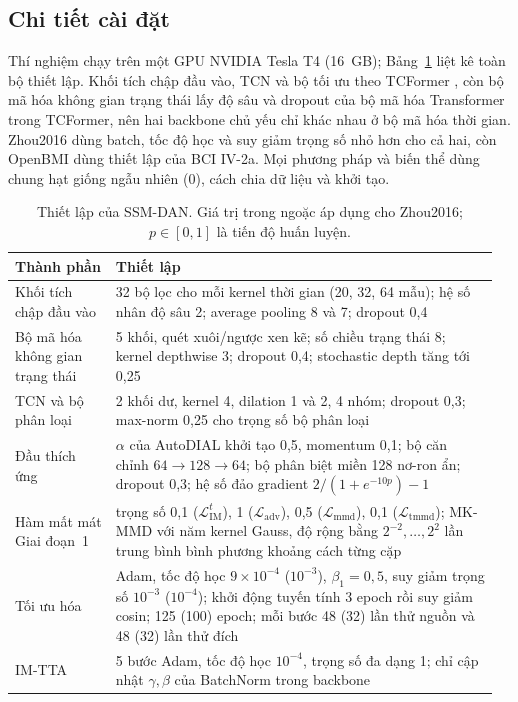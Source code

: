 \documentclass[preprint,12pt]{elsarticle}
\begin{document}
\subsection{Chi tiết cài đặt}
\label{subsec:training}

Thí nghiệm chạy trên một GPU NVIDIA Tesla T4 (16~GB); Bảng~\ref{tab:hyperparams} liệt kê toàn bộ thiết lập. Khối tích chập đầu vào, TCN và bộ tối ưu theo TCFormer \cite{altaheri2025tcformer}, còn bộ mã hóa không gian trạng thái lấy độ sâu và dropout của bộ mã hóa Transformer trong TCFormer, nên hai backbone chủ yếu chỉ khác nhau ở bộ mã hóa thời gian. Zhou2016 dùng batch, tốc độ học và suy giảm trọng số nhỏ hơn cho cả hai, còn OpenBMI dùng thiết lập của BCI IV-2a. Mọi phương pháp và biến thể dùng chung hạt giống ngẫu nhiên (0), cách chia dữ liệu và khởi tạo.

\begin{table}[!htbp]
\centering
\caption{Thiết lập của SSM-DAN. Giá trị trong ngoặc áp dụng cho Zhou2016; $p\in[0,1]$ là tiến độ huấn luyện.}
\label{tab:hyperparams}
\small
\begin{tabular}{@{}p{0.2\linewidth}p{0.76\linewidth}@{}}
\toprule
Thành phần & Thiết lập \\
\midrule
Khối tích chập đầu vào & 32 bộ lọc cho mỗi kernel thời gian (20, 32, 64 mẫu); hệ số nhân độ sâu 2; average pooling 8 và 7; dropout 0,4 \\
Bộ mã hóa không gian trạng thái & 5 khối, quét xuôi/ngược xen kẽ; số chiều trạng thái 8; kernel depthwise 3; dropout 0,4; stochastic depth tăng tới 0,25 \\
TCN và bộ phân loại & 2 khối dư, kernel 4, dilation 1 và 2, 4 nhóm; dropout 0,3; max-norm 0,25 cho trọng số bộ phân loại \\
Đầu thích ứng & $\alpha$ của AutoDIAL khởi tạo 0,5, momentum 0,1; bộ căn chỉnh $64\!\rightarrow\!128\!\rightarrow\!64$; bộ phân biệt miền 128 nơ-ron ẩn; dropout 0,3; hệ số đảo gradient $2/(1+e^{-10p})-1$ \cite{ganin2016dann} \\
Hàm mất mát Giai đoạn~1 & trọng số 0,1 ($\mathcal{L}_\mathrm{IM}^{t}$), 1 ($\mathcal{L}_\mathrm{adv}$), 0,5 ($\mathcal{L}_\mathrm{mmd}$), 0,1 ($\mathcal{L}_\mathrm{tmmd}$); MK-MMD với năm kernel Gauss, độ rộng bằng $2^{-2},\dots,2^{2}$ lần trung bình bình phương khoảng cách từng cặp \\
Tối ưu hóa & Adam, tốc độ học $9\times10^{-4}$ ($10^{-3}$), $\beta_1=0{,}5$, suy giảm trọng số $10^{-3}$ ($10^{-4}$); khởi động tuyến tính 3 epoch rồi suy giảm cosin; 125 (100) epoch; mỗi bước 48 (32) lần thử nguồn và 48 (32) lần thử đích \\
IM-TTA & 5 bước Adam, tốc độ học $10^{-4}$, trọng số đa dạng 1; chỉ cập nhật $\gamma,\beta$ của BatchNorm trong backbone \\
\bottomrule
\end{tabular}
\end{table}
\end{document}
